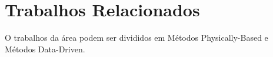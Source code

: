 \chapter{Trabalhos Relacionados}

O trabalhos da área podem ser divididos em Métodos Physically-Based e Métodos Data-Driven.





